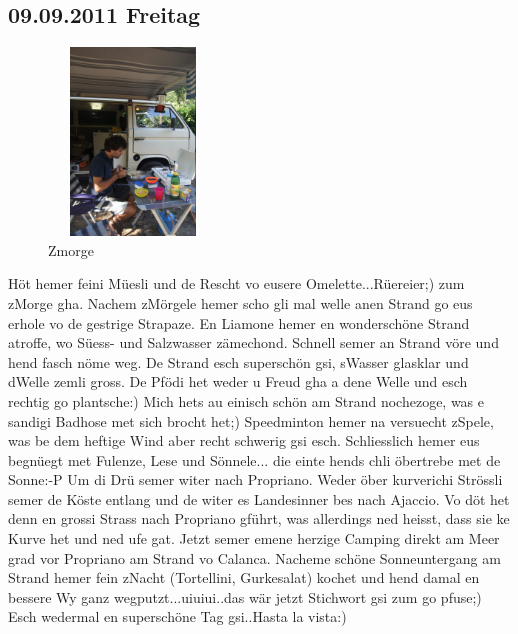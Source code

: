 \pagebreak

\subsection{09.09.2011 Freitag}

\begin{figure} 
  \begin{centering}
    \includegraphics[width=0.4\textwidth, height=5cm, keepaspectratio]{../Bilder/Korsika/33.jpg}
    \caption{Zmorge}
  \end{centering}
\end{figure} 

Höt hemer feini Müesli und de Rescht vo eusere Omelette...Rüereier;) zum zMorge gha. 
Nachem zMörgele hemer scho gli mal welle anen Strand go eus erhole vo de gestrige Strapaze.
En Liamone hemer en wonderschöne Strand atroffe, wo Süess- und Salzwasser zämechond.
Schnell semer an Strand vöre und hend fasch nöme weg.
De Strand esch superschön gsi, sWasser glasklar und dWelle zemli gross.
De Pfödi het weder u Freud gha a dene Welle und esch rechtig go plantsche:) Mich hets au einisch schön am Strand nochezoge, was e sandigi Badhose met sich brocht het;) Speedminton hemer na versuecht zSpele, was be dem heftige Wind aber recht schwerig gsi esch.
Schliesslich hemer eus begnüegt met Fulenze, Lese und Sönnele...
die einte hends chli öbertrebe met de Sonne:-P Um di Drü semer witer nach Propriano.
Weder öber kurverichi Strössli semer de Köste entlang und de witer es Landesinner bes nach Ajaccio.
Vo döt het denn en grossi Strass nach Propriano gführt, was allerdings ned heisst, dass sie ke Kurve het und ned ufe gat.
Jetzt semer emene herzige Camping direkt am Meer grad vor Propriano am Strand vo Calanca.
Nacheme schöne Sonneuntergang am Strand hemer fein zNacht (Tortellini, Gurkesalat) kochet und hend damal en bessere Wy ganz wegputzt...uiuiui..das wär jetzt Stichwort gsi zum go pfuse;) Esch wedermal en superschöne Tag gsi..Hasta la vista:)

